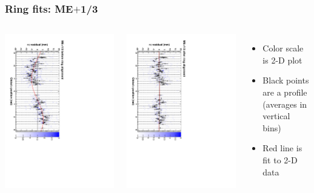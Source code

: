 \documentclass[compress]{beamer}
\begin{document}
\begin{frame}
\frametitle{Ring fits: ME$+$1/3}
\vfill
\begin{columns}
\includegraphics[height=\linewidth, angle=90]{ringfits_before/mep13.pdf}

\includegraphics[height=\linewidth, angle=90]{ringfits_after/mep13.pdf}
\begin{itemize}
\item Color scale is 2-D plot
\item Black points are a profile (averages in vertical bins)
\item Red line is fit to 2-D data
\end{itemize}
\end{columns}
\end{frame}
\end{document}

